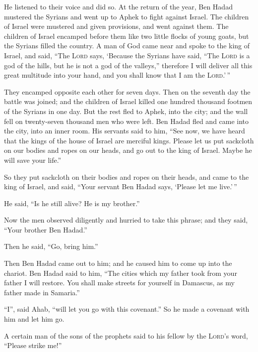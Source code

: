 He listened to their voice and did so.  At the return of
the year, Ben Hadad mustered the Syrians and went up to Aphek to fight
against Israel.  The children of Israel were mustered and
given provisions, and went against them. The children of Israel encamped
before them like two little flocks of young goats, but the Syrians
filled the country.  A man of God came near and spoke to
the king of Israel, and said, ``The \textsc{Lord} says, `Because the
Syrians have said, ``The \textsc{Lord} is a god of the hills, but he is
not a god of the valleys,'' therefore I will deliver all this great
multitude into your hand, and you shall know that I am the
\textsc{Lord}.'\,''

 They encamped opposite each other for seven days. Then
on the seventh day the battle was joined; and the children of Israel
killed one hundred thousand footmen of the Syrians in one day.
 But the rest fled to Aphek, into the city; and the wall
fell on twenty-seven thousand men who were left. Ben Hadad fled and came
into the city, into an inner room.  His servants said to
him, ``See now, we have heard that the kings of the house of Israel are
merciful kings. Please let us put sackcloth on our bodies and ropes on
our heads, and go out to the king of Israel. Maybe he will save your
life.''

 So they put sackcloth on their bodies and ropes on their
heads, and came to the king of Israel, and said, ``Your servant Ben
Hadad says, `Please let me live.'\,''

He said, ``Is he still alive? He is my brother.''

 Now the men observed diligently and hurried to take this
phrase; and they said, ``Your brother Ben Hadad.''

Then he said, ``Go, bring him.''

Then Ben Hadad came out to him; and he caused him to come up into the
chariot.  Ben Hadad said to him, ``The cities which my
father took from your father I will restore. You shall make streets for
yourself in Damascus, as my father made in Samaria.''

``I'', said Ahab, ``will let you go with this covenant.'' So he made a
covenant with him and let him go.

 A certain man of the sons of the prophets said to his
fellow by the \textsc{Lord}'s word, ``Please strike me!''

